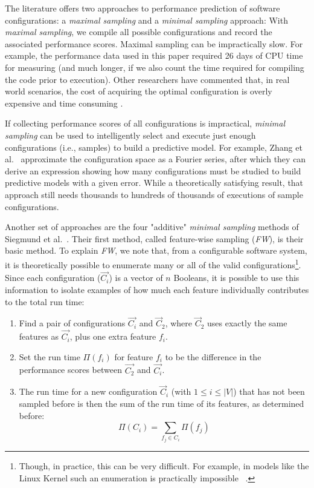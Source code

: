 \documentclass{newsig}
\begin{document}
The literature offers two approaches to performance prediction of software configurations: a {\em maximal sampling} and a {\em minimal sampling} approach: 
With {\em maximal sampling}, we compile all  possible configurations and record the associated performance scores. 
Maximal sampling  can be impractically slow. For example, the performance data used in this paper required  26 days of CPU time for measuring (and much longer, if we also count the time required for compiling the code prior to execution). 
 Other researchers have commented that,  in 
 real world scenarios, the cost of acquiring the optimal configuration is overly expensive and time consuming \cite{weiss2008maximizing}.
 
 If collecting performance scores of all configurations is impractical,  {\em minimal sampling} 
 can be used to intelligently select and execute just enough configurations (i.e., samples) to build a
 predictive model.
 For example, Zhang et al.~\cite{zhang2015performance} approximate the
configuration space as a Fourier series, after which they can derive an expression showing how many configurations must be studied
 to build predictive models with a given error. While a theoretically satisfying result, that approach still needs thousands to hundreds of thousands of executions of sample
 configurations.  

Another set of approaches are the four "additive" {\em minimal sampling} methods of Siegmund et al.~\cite{siegmund2012predicting}.
Their first method, called feature-wise sampling ({\em FW}), is their basic method.
To explain {\em FW}, we note that, from a configurable software system, it is theoretically possible to enumerate many or all of the valid configurations\footnote{Though, in practice, this can be very difficult. For example, in models like the Linux Kernel such an enumeration is practically impossible ~\cite{sayyad13b}.}. 
Since each configuration ($\vec{C_i}$) is a vector of $n$ Booleans, it  is possible to use this information to isolate examples of how much each feature individually contributes to the total run time:
\begin{enumerate}
\item Find a pair of  configurations $\vec{C_i}$ and $\vec{C}_2$, where $\vec{C}_2$ uses exactly the same features as $\vec{C_i}$, plus one  extra feature $f_i$.
\item Set the run time $\Pi(f_i)$ for feature $f_i$ to be the difference in the performance scores between $\vec{C_2}$ and $\vec{C_i}$.
\item The run time  for a new configuration  $\vec{C}_i$ (with $1\leq i\leq \left\vert{V}\right\vert$) that has not been sampled before is then the sum of the run time of its features, as determined before:
\begin{equation}
  \Pi(C_i) = \sum_{f_j \in C_i}\Pi(f_j)  
\end{equation}
\end{enumerate}
\end{document}
